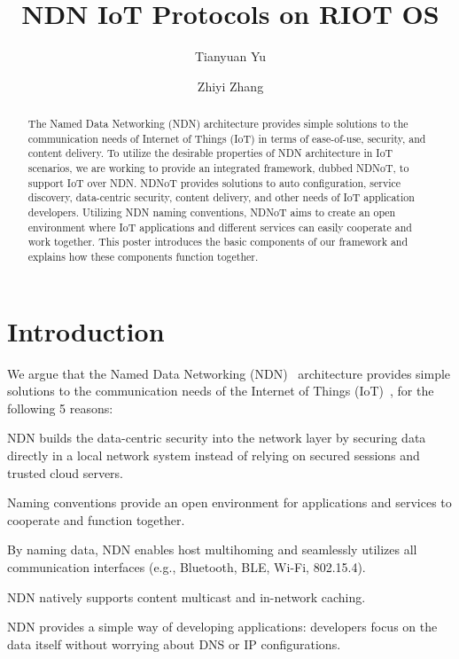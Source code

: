\documentclass[sigconf]{acmart}
\begin{document}
\title{NDN IoT Protocols on RIOT OS}

\author{Tianyuan Yu}

\author{Zhiyi Zhang}

\begin{abstract}

The Named Data Networking (NDN) architecture provides simple solutions to the communication needs of Internet of Things (IoT) in terms of ease-of-use, security, and content delivery.
To utilize the desirable properties of NDN architecture in IoT scenarios, we are working to provide an integrated framework, dubbed NDNoT, to support IoT over NDN.
NDNoT provides solutions to auto configuration, service discovery, data-centric security, content delivery, and other needs of IoT application developers.
Utilizing NDN naming conventions, NDNoT aims to create an open environment where IoT applications and different services can easily cooperate and work together.
This poster introduces the basic components of our framework and explains how these components function together.
\end{abstract}

\maketitle

\section{Introduction}

We argue that the Named Data Networking (NDN)~\cite{ndn-ccr} architecture provides simple solutions to the communication needs of the Internet of Things (IoT)~\cite{ndn-iot}, for the following 5 reasons:
\begin{enumerate*} [label=(\roman*)]
	\item NDN builds the data-centric security into the network layer by securing data directly in a local network system instead of relying on secured sessions and trusted cloud servers.
	\item Naming conventions provide an open environment for applications and services to cooperate and function together.
	\item By naming data, NDN enables host multihoming and seamlessly utilizes all  communication interfaces (e.g., Bluetooth, BLE, Wi-Fi, 802.15.4).
	\item NDN natively supports content multicast and in-network caching.
	\item NDN provides a simple way of developing applications: developers focus on the data itself without worrying about DNS or IP configurations.
\end{enumerate*}
\end{document}

